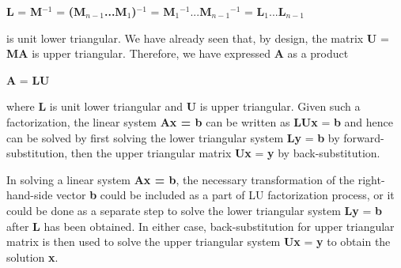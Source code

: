 \documentclass[12pt]{article}
\begin{document}
{\vspace{.5cm}

\textbf{L} = \textbf{M$^{-1}$} =
\textbf{(\textbf{M$_{n-1}$}...\textbf{M$_{1}$})$^{-1}$} =
\textbf{{M$_{1}$}$^{-1}$}...\textbf{{M$_{n-1}$}$^{-1}$} =
\textbf{L$_{1}$}...\textbf{L$_{n-1}$}

\vspace{.5cm}

is unit lower triangular. We have already seen that, by design, the matrix
\textbf{U} = \textbf{MA} is upper triangular. Therefore, we have expressed
\textbf{A} as a product

\vspace{.5cm}

\textbf{A} = \textbf{LU}

\vspace{.5cm}

where \textbf{L} is unit lower triangular and \textbf{U} is upper triangular.
Given such a factorization, the linear system \textbf{Ax = b} can be written as
\textbf{LUx} = \textbf{b} and hence can be solved by first solving the lower
triangular system \textbf{Ly} = \textbf{b} by forward-substitution, then the
upper triangular matrix \textbf{Ux} = \textbf{y} by back-substitution.

In solving a linear system \textbf{Ax = b}, the necessary transformation of the
right-hand-side vector \textbf{b} could be included as a part of LU
factorization process, or it could be done as a separate step to solve the lower
triangular system \textbf{Ly} = \textbf{b} after \textbf{L} has been obtained.
In either case, back-substitution for upper triangular matrix is then used to
solve the upper triangular system \textbf{Ux} = \textbf{y} to obtain the
solution \textbf{x}.


}
~\newline

\end{document}
